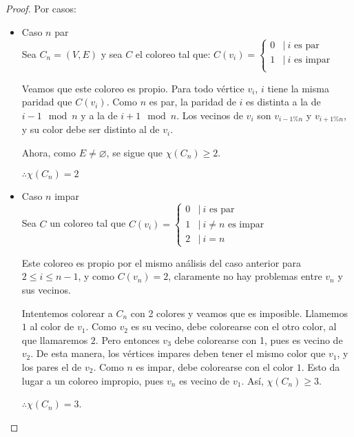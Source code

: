 \begin{proof}
Por casos:
\begin{itemize}
    \item Caso $n$ par\\
    Sea $C_n = (V,E)$ y sea $C$ el coloreo tal que: 
        $C(v_i) =
        \begin{cases}
            0 & |\ \text{$i$ es par}\\
            1 & |\ \text{$i$ es impar}\\
        \end{cases}$
        
    Veamos que este coloreo es propio. Para todo vértice $v_{i}$, $i$ tiene la misma paridad que $C(v_{i})$. Como $n$ es par, la paridad de $i$ es distinta a la de $i-1 \mod{n}$ y a la de $i+1 \mod{n}$. Los vecinos de $v_{i}$ son $v_{i-1 \% n}$ y $v_{i+1 \% n}$, y su color debe ser distinto al de $v_{i}$.

    Ahora, como $E \neq \varnothing$, se sigue que $\chi(C_n) \ge 2$.
    
    $\therefore \chi(C_n) = 2$
    
    \item Caso $n$ impar\\
    Sea $C$ un coloreo tal que $C(v_i) =
        \begin{cases} 
            0  & |\ \text{$i$ es par} \\
            1  & |\ \text{$i \neq n$ es impar}\\
            2  & |\ i = n 
         \end{cases}$


    Este coloreo es propio por el mismo análisis del caso anterior para $2 \le i \le n-1$, y como $C(v_{n}) = 2$, claramente no hay problemas entre $v_{n}$ y sus vecinos.

    Intentemos colorear a $ C_{n}$ con 2 colores y veamos que es imposible. Llamemos $1$ al color de $v_{1}$. Como $v_{2}$ es su vecino, debe colorearse con el otro color, al que llamaremos $2$. Pero entonces $v_{3}$ debe colorearse con 1, pues es vecino de $v_{2}$. De esta manera, los vértices impares deben tener el mismo color que $v_{1}$, y los pares el de $v_{2}$. Como $n$ es impar, debe colorearse con el color $1$. Esto da lugar a un coloreo impropio, pues $v_{n}$ es vecino de $v_{1}$. Así, $\chi(C_{n}) \ge 3$.
    
    $\therefore \chi(C_n) = 3$.
\end{itemize}
\end{proof}

